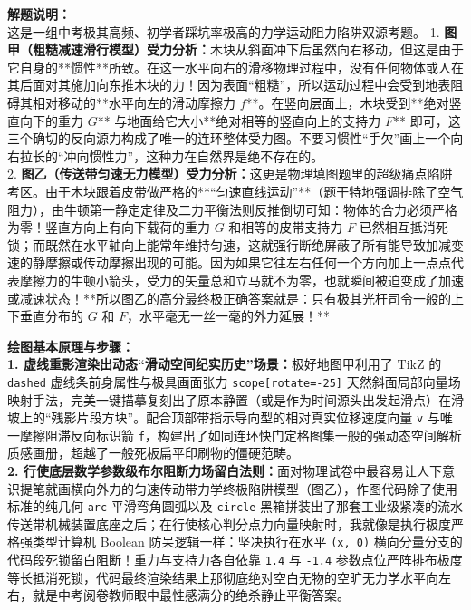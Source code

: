 \documentclass[12pt, a4paper]{ctexrep}
\begin{document}
{\small\color{gray}
\textbf{解题说明：}\\
这是一组中考极其高频、初学者踩坑率极高的力学运动阻力陷阱双源考题。
1. \textbf{图甲（粗糙减速滑行模型）受力分析：}木块从斜面冲下后虽然向右移动，但这是由于它自身的**惯性**所致。在这一水平向右的滑移物理过程中，没有任何物体或人在其后面对其施加向东推木块的力！因为表面“粗糙”，所以运动过程中会受到地表阻碍其相对移动的**水平向左的滑动摩擦力 $f$**。在竖向层面上，木块受到**绝对竖直向下的重力 $G$** 与地面给它大小**绝对相等的竖直向上的支持力 $F$** 即可，这三个确切的反向源力构成了唯一的连环整体受力图。不要习惯性“手欠”画上一个向右拉长的“冲向惯性力”，这种力在自然界是绝不存在的。\\
2. \textbf{图乙（传送带匀速无力模型）受力分析：}这更是物理填图题里的超级痛点陷阱考区。由于木块跟着皮带做严格的**“匀速直线运动”**（题干特地强调排除了空气阻力），由牛顿第一静定定律及二力平衡法则反推倒切可知：物体的合力必须严格为零！竖直方向上有向下载荷的重力 $G$ 和相等的皮带支持力 $F$ 已然相互抵消死锁；而既然在水平轴向上能常年维持匀速，这就强行断绝屏蔽了所有能导致加减变速的静摩擦或传动摩擦出现的可能。因为如果它往左右任何一个方向加上一点点代表摩擦力的牛顿小箭头，受力的矢量总和立马就不为零，也就瞬间被迫变成了加速或减速状态！**所以图乙的高分最终极正确答案就是：只有极其光杆司令一般的上下垂直分布的 $G$ 和 $F$，水平毫无一丝一毫的外力延展！**
}

\vspace{0.6cm}

{\small\color{blue!70!black}
\textbf{绘图基本原理与步骤：}\\
\textbf{1. 虚线重影渲染出动态“滑动空间纪实历史”场景：}极好地图甲利用了 TikZ 的 \texttt{dashed} 虚线条前身属性与极具画面张力 \texttt{scope[rotate=-25]} 天然斜面局部向量场映射手法，完美一键描摹复刻出了原本静置（或是作为时间源头出发起滑点）在滑坡上的“残影片段方块”。配合顶部带指示导向型的相对真实位移速度向量 \texttt{v} 与唯一摩擦阻滞反向标识箭 \texttt{f}，构建出了如同连环快门定格图集一般的强动态空间解析质感画册，超越了一般死板扁平印刷物的僵硬范畴。\\
\textbf{2. 行使底层数学参数级布尔阻断力场留白法则：}面对物理试卷中最容易让人下意识提笔就画横向外力的匀速传动带力学终极陷阱模型（图乙），作图代码除了使用标准的纯几何 \texttt{arc} 平滑弯角圆弧以及 \texttt{circle} 黑箱拼装出了那套工业级紧凑的流水传送带机械装置底座之后；在行使核心判分点力向量映射时，我就像是执行极度严格强类型计算机 Boolean 防呆逻辑一样：坚决执行在水平 \texttt{(x, 0)} 横向分量分支的代码段死锁留白阻断！重力与支持力各自依靠 \texttt{1.4} 与 \texttt{-1.4} 参数点位严阵排布极度等长抵消死锁，代码最终渲染结果上那彻底绝对空白无物的空旷无力学水平向左右，就是中考阅卷教师眼中最性感满分的绝杀静止平衡答案。
}
\end{document}
